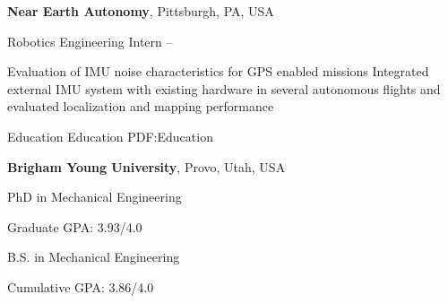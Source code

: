 \documentclass[letterpaper,MMMyyyy,nonstopmode]{simpleresumecv}
\begin{document}
\begin{Body}
\Gap
\Entry
\textbf{Near Earth Autonomy},
Pittsburgh, PA, USA

\Gap
\BulletItem
Robotics Engineering Intern
\hfill
{} --
\begin{Detail}
\SubBulletItem
Evaluation of IMU noise characteristics for GPS enabled missions
\SubBulletItem
Integrated external IMU system with existing hardware in several autonomous flights and evaluated localization and mapping performance
\end{Detail}





\Section
{Education}
{Education}
{PDF:Education}

\Entry
{\textbf{Brigham Young University}},
Provo, Utah, USA

\Gap
\BulletItem
PhD in Mechanical Engineering
\hfill
\begin{Detail}
\SubBulletItem
Graduate GPA: 3.93/4.0
\end{Detail}

\BulletItem
B.S. in Mechanical Engineering
\hfill
\begin{Detail}
\SubBulletItem
Cumulative GPA: 3.86/4.0
\end{Detail}


\end{Body}
\end{document}
